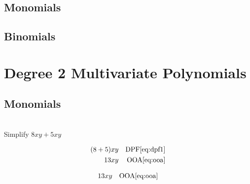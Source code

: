 \subsection*{Monomials}

\subsection*{Binomials}

\section*{Degree 2 Multivariate Polynomials}

\subsection*{Monomials}

\begin{example}[id:20141106-150953] \label{20141106-150953}  \hfill \\

Simplify $8xy+5xy$

\soln

\solnsteps
\begin{align*}
(8+5)xy && \text{DPF} \eqref{eq:dpf1} \\
13xy && \text{OOA} \eqref{eq:ooa} 
\end{align*}

\soln

\lesssteps
\begin{align*}
13xy && \text{OOA} \eqref{eq:ooa} 
\end{align*}

\end{example}

